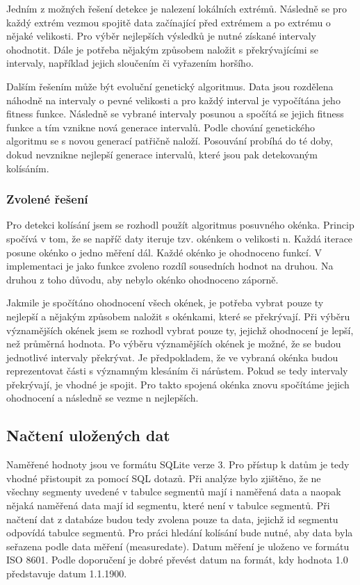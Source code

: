 \documentclass{article}
\begin{document}
	Jedním z možných řešení detekce je nalezení lokálních extrémů. Následně se pro každý extrém vezmou spojitě data začínající před extrémem a po extrému o nějaké velikosti. Pro výběr nejlepších výsledků je nutné získané intervaly ohodnotit. Dále je potřeba nějakým způsobem naložit s překrývajícími se intervaly, například jejich sloučením či vyřazením horšího.
	
	Dalším řešením může být evoluční genetický algoritmus. 
	Data jsou rozdělena náhodně na intervaly o pevné velikosti a pro každý interval je vypočítána jeho fitness funkce. Následně se vybrané intervaly posunou a spočítá se jejich fitness funkce a tím vznikne nová generace intervalů. Podle chování genetického algoritmu se s novou generací patřičně naloží. Posouvání probíhá do té doby, dokud nevznikne nejlepší generace intervalů, které jsou pak detekovaným kolísáním.
	
	\subsubsection{Zvolené řešení}
	\label{sec:zvoleneReseni}
	Pro detekci kolísání jsem se rozhodl použít algoritmus posuvného okénka. Princip spočívá v tom, že se napříč daty iteruje tzv. okénkem o velikosti n. Každá iterace posune okénko o jedno měření dál. Každé okénko je ohodnoceno funkcí. 
	V implementaci je jako funkce zvoleno rozdíl sousedních hodnot na druhou. 
	Na druhou z toho důvodu, aby nebylo okénko ohodnoceno záporně. 
	
	Jakmile je spočítáno ohodnocení všech okének, je potřeba vybrat pouze ty nejlepší a nějakým způsobem naložit s okénkami, které se překrývají. Při výběru významějších okének jsem se rozhodl vybrat pouze ty, jejichž ohodnocení je lepší, než průměrná hodnota.
	Po výběru významějších okének je možné, že se budou jednotlivé intervaly překrývat. Je předpokladem, že ve vybraná okénka budou reprezentovat části s významným klesáním či nárůstem. Pokud se tedy intervaly překrývají, je vhodné je spojit. Pro takto spojená okénka znovu spočítáme jejich ohodnocení a následně se vezme n nejlepších.
	\subsection{Načtení uložených dat}
	
	Naměřené hodnoty jsou ve formátu SQLite verze 3. Pro přístup k datům je tedy vhodné přistoupit za pomocí SQL dotazů. Při analýze bylo zjištěno, že ne všechny segmenty uvedené v tabulce segmentů mají i naměřená data a naopak nějaká naměřená data mají id segmentu, které není v tabulce segmentů. Při načtení dat z databáze budou tedy zvolena pouze ta data, jejichž id segmentu odpovídá tabulce segmentů.
	Pro práci hledání kolísání bude nutné, aby data byla seřazena podle data měření (measuredate). Datum měření je uloženo ve formátu ISO 8601. Podle doporučení je dobré převést datum na formát, kdy hodnota 1.0 představuje datum 1.1.1900.
\end{document}
